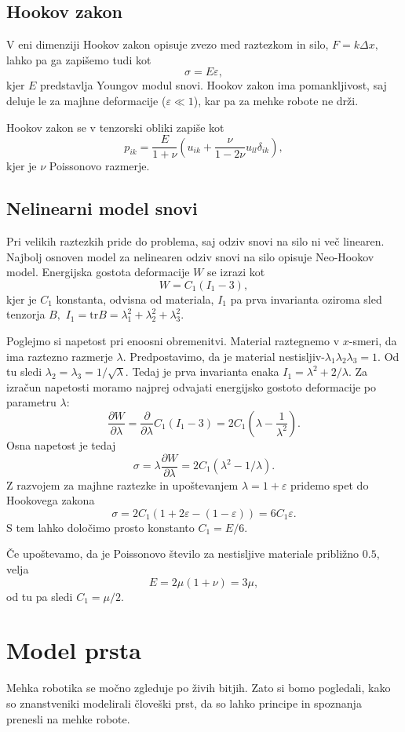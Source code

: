 \documentclass[12pt ]{article}
\begin{document}
\subsection{Hookov zakon}
V eni dimenziji Hookov zakon opisuje zvezo med raztezkom in silo, $F=k\Delta x,$ lahko pa ga zapišemo tudi kot $$\sigma=E\varepsilon,$$ kjer $E$ predstavlja Youngov modul snovi. Hookov zakon ima pomankljivost, saj deluje le za majhne deformacije ($\varepsilon\ll1$), kar pa za mehke robote ne drži.

Hookov zakon se v tenzorski obliki zapiše kot $$p_{ik}=\frac{E}{1+\nu}\left (u_{ik}+\frac{\nu}{1-2\nu}u_{ll}\delta_{ik}\right ),$$ kjer je $\nu$ Poissonovo razmerje. 

\subsection{Nelinearni model snovi}
Pri velikih raztezkih pride do problema, saj odziv snovi na silo ni več linearen. Najbolj osnoven model za nelinearen odziv snovi na silo opisuje Neo-Hookov model. Energijska gostota deformacije $W$ se izrazi kot $$W=C_1(I_1-3),$$ kjer je $C_1$ konstanta, odvisna od materiala, $I_1$ pa prva invarianta oziroma sled tenzorja $B,$ $I_1=\mathrm{tr}B=\lambda_1^2+\lambda_2^2+\lambda_3^2.$ 

Poglejmo si napetost pri enoosni obremenitvi. Material raztegnemo v $x$-smeri, da ima raztezno razmerje $\lambda$. Predpostavimo, da je material nestisljiv-$\lambda_1\lambda_2\lambda_3=1.$ Od tu sledi $\lambda_2=\lambda_3=1/\sqrt{\lambda}.$ Tedaj je prva invarianta enaka $I_1=\lambda^2+2/\lambda$. Za izračun napetosti moramo najprej odvajati energijsko gostoto deformacije po parametru $\lambda:$ $$\frac{\partial W}{\partial \lambda}=\frac{\partial}{\partial\lambda}C_1(I_1-3)=2C_1(\lambda-\frac{1}{\lambda^2}).$$ Osna napetost je tedaj $$\sigma=\lambda\frac{\partial W}{\partial \lambda}=2C_1(\lambda^2-1/\lambda).$$ Z razvojem za majhne raztezke in upoštevanjem $\lambda=1+\varepsilon$ pridemo spet do Hookovega zakona $$\sigma =2C_1(1+2\varepsilon-(1-\varepsilon))=6C_1\varepsilon.$$ S tem lahko določimo prosto konstanto $C_1=E/6.$ 

Če upoštevamo, da je Poissonovo število za nestisljive materiale približno $0.5$, velja $$E=2\mu(1+\nu)=3\mu,$$ od tu pa sledi $C_1=\mu/2$\cite{wiki}.

\section{Model prsta}
Mehka robotika se močno zgleduje po živih bitjih. Zato si bomo pogledali, kako so znanstveniki modelirali človeški prst, da so lahko principe in spoznanja prenesli na mehke robote.
\end{document}
